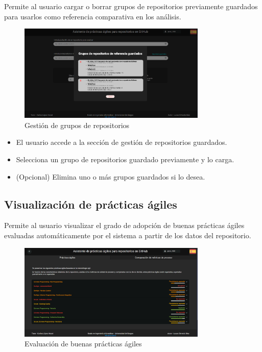 Permite al usuario cargar o borrar grupos de repositorios previamente guardados para usarlos como referencia comparativa en los análisis.

\begin{figure}[H]
\centering
\includegraphics[width=0.8\textwidth]{img/E5-grupos.png}
\caption{Gestión de grupos de repositorios}
\label{fig:E5-grupos}
\end{figure}

\begin{itemize}
    \item El usuario accede a la sección de gestión de repositorios guardados.
    \item Selecciona un grupo de repositorios guardado previamente y lo carga.
    \item (Opcional) Elimina uno o más grupos guardados si lo desea.
\end{itemize}

\newpage
\subsection{Visualización de prácticas ágiles}

Permite al usuario visualizar el grado de adopción de buenas prácticas ágiles evaluadas automáticamente por el sistema a partir de los datos del repositorio.

\begin{figure}[H]
\centering
\includegraphics[width=0.8\textwidth]{img/E6-practicas-agiles.png}
\caption{Evaluación de buenas prácticas ágiles}
\label{fig:E6-practicas-agiles}
\end{figure}

